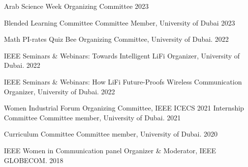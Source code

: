 

\begin{cvhonors}
\cvhonor
{Arab Science Week}
     {Organizing Committee}
    {} %
    {2023} %

  


   
    \cvhonor
    {Blended Learning Committee} %
    {Committee Member, University of Dubai} %
    {} %
    {2023} %

          \cvhonor
    {Math PI-rates Quiz Bee} %
    {Organizing Committee, University of Dubai.} %
    {} %
    {2022} %

       \cvhonor
    {IEEE Seminars \& Webinars: Towards Intelligent LiFi} %
    {Organizer, University of Dubai.} %
    {} %
    {2022} %

           \cvhonor
    {IEEE Seminars \& Webinars: How LiFi Future-Proofs Wireless Communication} %
    {Organizer, University of Dubai.} %
    {} %
    {2022} %

 \cvhonor
  {Women Industrial Forum}
  {Organizing Committee, IEEE ICECS} %
    {} %
    {2021} %
  \cvhonor
    {Internship Committee} %
    {Committee member, University of Dubai.} %
    {} %
    {2021} %

  \cvhonor
    {Curriculum Committee} %
    {Committee member, University of Dubai.} %
    {} %
    {2020} %

    \cvhonor
    {IEEE Women in Communication panel}
    {Organizer \& Moderator, IEEE GLOBECOM.}
      {}
     {2018}
\end{cvhonors}



